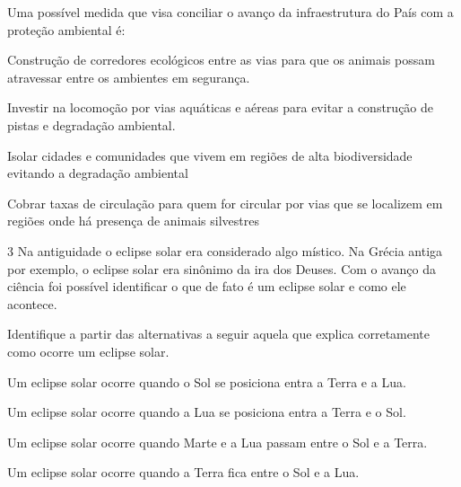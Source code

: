 Uma possível medida que visa conciliar o avanço da infraestrutura do
País com a proteção ambiental é:

\begin{escolha}
\item
  Construção de corredores ecológicos entre as vias para que os animais
  possam atravessar entre os ambientes em segurança.
\item
  Investir na locomoção por vias aquáticas e aéreas para evitar a
  construção de pistas e degradação ambiental.
\item
  Isolar cidades e comunidades que vivem em regiões de alta
  biodiversidade evitando a degradação ambiental
\item
  Cobrar taxas de circulação para quem for circular por vias que se
  localizem em regiões onde há presença de animais silvestres
\end{escolha}


\num{3}
  Na antiguidade o eclipse solar era considerado algo místico. Na Grécia
  antiga por exemplo, o eclipse solar era sinônimo da ira dos Deuses.
  Com o avanço da ciência foi possível identificar o que de fato é um
  eclipse solar e como ele acontece.


Identifique a partir das alternativas a seguir aquela que explica
corretamente como ocorre um eclipse solar.

\begin{escolha}
\item
  Um eclipse solar ocorre quando o Sol se posiciona entra a Terra e a
  Lua.
\item
  Um eclipse solar ocorre quando a Lua se posiciona entra a Terra e o
  Sol.
\item
  Um eclipse solar ocorre quando Marte e a Lua passam entre o Sol e a
  Terra.
\item
  Um eclipse solar ocorre quando a Terra fica entre o Sol e a Lua.
\end{escolha}

